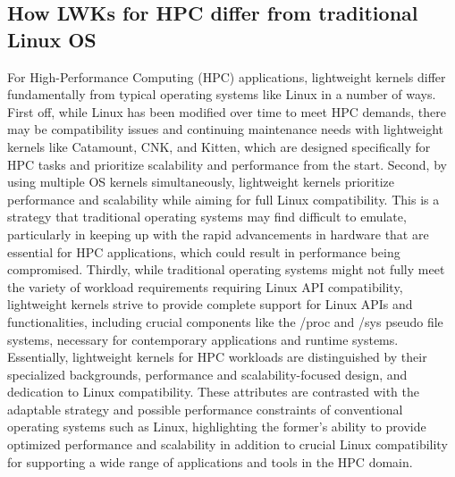 \documentclass[16pt,a4paper]{article}
\begin{document}
\subsection{How LWKs for HPC differ from traditional Linux OS}
For High-Performance Computing (HPC) applications, lightweight kernels differ fundamentally from typical operating systems like Linux in a number of ways. First off, while Linux has been modified over time to meet HPC demands, there may be compatibility issues and continuing maintenance needs with lightweight kernels like Catamount, CNK, and Kitten, which are designed specifically for HPC tasks and prioritize scalability and performance from the start. Second, by using multiple OS kernels simultaneously, lightweight kernels prioritize performance and scalability while aiming for full Linux compatibility. This is a strategy that traditional operating systems may find difficult to emulate, particularly in keeping up with the rapid advancements in hardware that are essential for HPC applications, which could result in performance being compromised. Thirdly, while traditional operating systems might not fully meet the variety of workload requirements requiring Linux API compatibility, lightweight kernels strive to provide complete support for Linux APIs and functionalities, including crucial components like the /proc and /sys pseudo file systems, necessary for contemporary applications and runtime systems. Essentially, lightweight kernels for HPC workloads are distinguished by their specialized backgrounds, performance and scalability-focused design, and dedication to Linux compatibility. These attributes are contrasted with the adaptable strategy and possible performance constraints of conventional operating systems such as Linux, highlighting the former's ability to provide optimized performance and scalability in addition to crucial Linux compatibility for supporting a wide range of applications and tools in the HPC domain.
\end{document}
